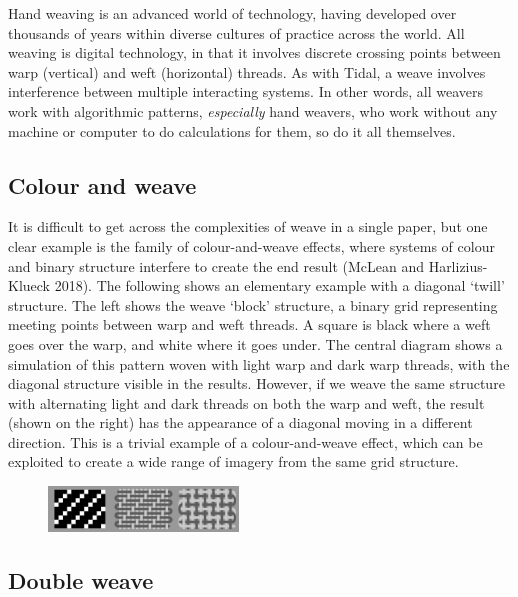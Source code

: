 \documentclass{nime-alternate} %
\begin{document}
Hand weaving is an advanced world of technology, having developed over
thousands of years within diverse cultures of practice across the world.
All weaving is digital technology, in that it involves discrete crossing
points between warp (vertical) and weft (horizontal) threads. As with
Tidal, a weave involves interference between multiple interacting
systems. In other words, all weavers work with algorithmic patterns,
\emph{especially} hand weavers, who work without any machine or computer
to do calculations for them, so do it all themselves.

\hypertarget{colour-and-weave}{%
\subsection{Colour and weave}\label{colour-and-weave}}

It is difficult to get across the complexities of weave in a single
paper, but one clear example is the family of colour-and-weave effects,
where systems of colour and binary structure interfere to create the end
result (McLean and Harlizius-Klueck 2018). The following shows an
elementary example with a diagonal `twill' structure. The left shows the
weave `block' structure, a binary grid representing meeting points
between warp and weft threads. A square is black where a weft goes over
the warp, and white where it goes under. The central diagram shows a
simulation of this pattern woven with light warp and dark warp threads,
with the diagonal structure visible in the results. However, if we weave
the same structure with alternating light and dark threads on both the
warp and weft, the result (shown on the right) has the appearance of a
diagonal moving in a different direction. This is a trivial example of a
colour-and-weave effect, which can be exploited to create a wide range
of imagery from the same grid structure.

\begin{figure}[h]
\includegraphics[width=0.45\textwidth]{twill.png}
\end{figure}

\hypertarget{double-weave}{%
\subsection{Double weave}\label{double-weave}}
\end{document}
